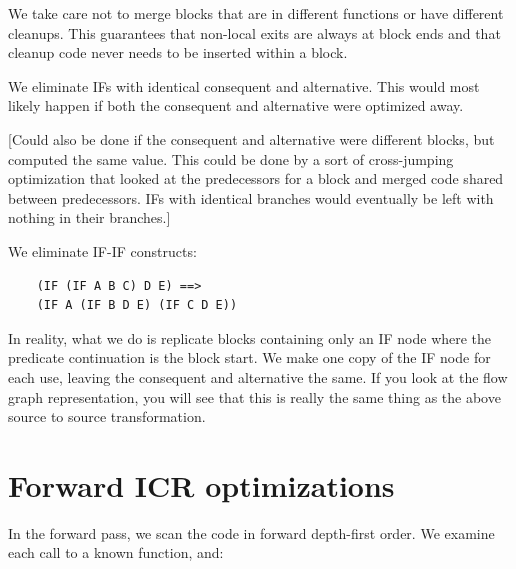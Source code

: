 We take care not to merge blocks that are in different functions or have
different cleanups.  This guarantees that non-local exits are always at block
ends and that cleanup code never needs to be inserted within a block.

We eliminate IFs with identical consequent and alternative.  This would most
likely happen if both the consequent and alternative were optimized away.

[Could also be done if the consequent and alternative were different blocks,
but computed the same value.  This could be done by a sort of cross-jumping
optimization that looked at the predecessors for a block and merged code shared
between predecessors.  IFs with identical branches would eventually be left
with nothing in their branches.]

We eliminate IF-IF constructs:

\begin{verbatim}
    (IF (IF A B C) D E) ==>
    (IF A (IF B D E) (IF C D E))
\end{verbatim}

In reality, what we do is replicate blocks containing only an IF node where the
predicate continuation is the block start.  We make one copy of the IF node for
each use, leaving the consequent and alternative the same.  If you look at the
flow graph representation, you will see that this is really the same thing as
the above source to source transformation.

\section{Forward ICR optimizations}

In the forward pass, we scan the code in forward depth-first order.  We
examine each call to a known function, and:

